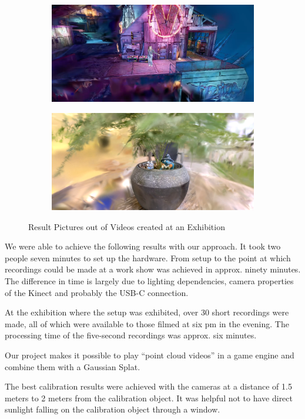 \documentclass[conference]{IEEEtran}
\begin{document}
\begin{figure}[h]
\begin{subfigure}{.24\textwidth}
    \includegraphics[width=\linewidth]{Pictures/ResPic3.png}
    \end{subfigure}
    \begin{subfigure}{.24\textwidth}
    \includegraphics[width=\linewidth]{Pictures/ResPic4.png}
    \end{subfigure}
    \caption{Result Pictures out of Videos created at an Exhibition}
    \label{fig:ResultPictures}
\end{figure}
We were able to achieve the following results with our approach. It took two people seven minutes to set up the hardware. From setup to the point at which recordings could be made at a work show was achieved in approx. ninety minutes. The difference in time is largely due to lighting dependencies, camera properties of the Kinect and probably the USB-C connection.

At the exhibition where the setup was exhibited, over 30 short recordings were made, all of which were available to those filmed at six pm in the evening. The processing time of the five-second recordings was approx. six minutes.

Our project makes it possible to play “point cloud videos” in a game engine and combine them with a Gaussian Splat.

The best calibration results were achieved with the cameras at a distance of 1.5 meters to 2 meters from the calibration object. It was helpful not to have direct sunlight falling on the calibration object through a window.
\end{document}
